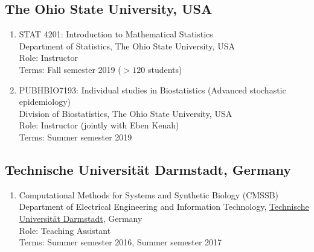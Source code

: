 \documentclass[11pt,a4paper,sans]{moderncv}        %
\begin{document}
\subsection{The Ohio State University, USA}
\begin{enumerate}
	\item STAT 4201: Introduction to Mathematical Statistics\\Department of Statistics, The Ohio State University, USA\\Role: Instructor\\Terms: Fall semester 2019 ($>120$ students)
	\item PUBHBIO7193: Individual studies in Biostatistics (Advanced stochastic epidemiology)\\Division of Biostatistics, The Ohio State University, USA\\Role: Instructor (jointly with Eben Kenah)\\Terms: Summer semester 2019
\end{enumerate}

\subsection{Technische Universit\"at Darmstadt, Germany}
\begin{enumerate}
	\item Computational Methods for Systems and Synthetic Biology (CMSSB) \\Department of Electrical Engineering and Information Technology, \href{http://www.tu-darmstadt.de/index.en.jsp}{Technische Universit\"{a}t Darmstadt}, Germany\\Role: Teaching Assistant\\Terms: Summer semester 2016, Summer semester 2017
\end{enumerate}
\end{document}
